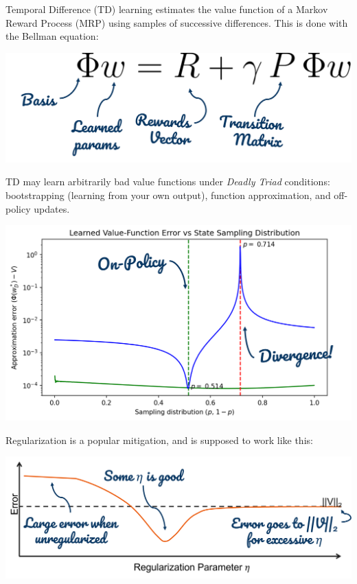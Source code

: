 
Temporal Difference (TD) learning estimates the value function of a Markov Reward Process (MRP) using samples of successive differences. This is done with the Bellman equation:
\begin{center}
    \includegraphics[scale=0.4]{parts/intro/bellman}
\end{center}\vspace{-.1in}
TD may learn arbitrarily bad value functions under \emph{Deadly Triad} conditions:
bootstrapping (learning from your own output),
function approximation, and
off-policy updates.
\vspace{-.11in}
\begin{center}
    \includegraphics[scale=0.4]{parts/intro/threestatedivergence}
\end{center}\vspace{-.1in}
Regularization is a popular mitigation, and is supposed to work like this:
\begin{center}
    \includegraphics[scale=0.4]{parts/intro/regworks}
\end{center}
